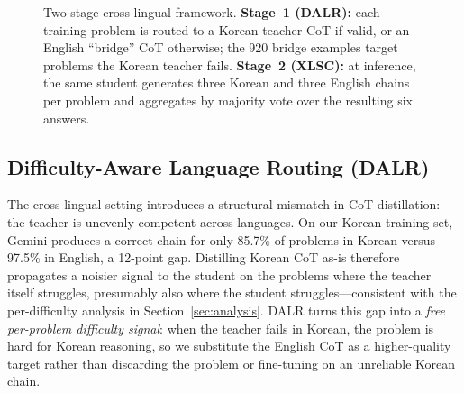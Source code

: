 \documentclass{article}
\begin{document}
\begin{figure}[t]
{%
}
\caption{Two-stage cross-lingual framework.
\textbf{Stage~1 (DALR):} each training problem is routed to a Korean
teacher CoT if valid, or an English ``bridge'' CoT otherwise; the
920 bridge examples target problems the Korean teacher fails.
\textbf{Stage~2 (XLSC):} at inference, the same student generates
three Korean and three English chains per problem and aggregates by
majority vote over the resulting six answers.}
\label{fig:pipeline}
\end{figure}


\subsection{Difficulty-Aware Language Routing (DALR)}
\label{sec:dalr}

The cross-lingual setting introduces a structural mismatch in CoT
distillation: the teacher is unevenly competent across languages.
On our Korean training set, Gemini produces a correct chain for only
85.7\% of problems in Korean versus 97.5\% in English, a 12-point
gap. Distilling Korean CoT as-is therefore propagates a noisier
signal to the student on the problems where the teacher itself
struggles, presumably also where the student struggles---consistent with
the per-difficulty analysis in Section~\ref{sec:analysis}. DALR turns this gap into
a \emph{free per-problem difficulty signal}: when the teacher fails
in Korean, the problem is hard for Korean reasoning, so we
substitute the English CoT as a higher-quality target rather than
discarding the problem or fine-tuning on an unreliable Korean chain.
\end{document}
